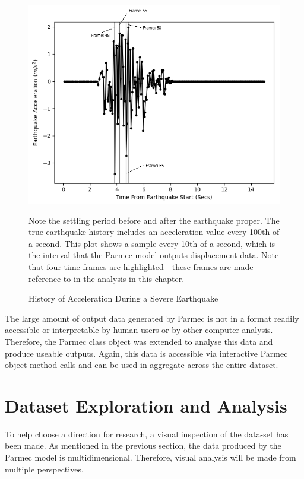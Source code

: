 \begin{figure}[ht]
	\centering
	\includegraphics[scale=0.85]{Figures/earthquake_time_points}
	\caption{History of Acceleration During a Severe Earthquake} {Note the settling period before and after the earthquake proper. The true earthquake history includes an acceleration value every 100th of a second. This plot shows a sample every 10th of a second, which is the interval that the Parmec model outputs displacement data. Note that four time frames are highlighted - these frames are made reference to in the analysis in this chapter.}
	\label{fig:earthquake}
\end{figure}

\noindent
The large amount of output data generated by Parmec is not in a format readily accessible or interpretable by human users or by other computer analysis. Therefore, the Parmec class object was extended to analyse this data and produce useable outputs. Again, this data is accessible via interactive Parmec object method calls and can be used in aggregate across the entire dataset.


\section{Dataset Exploration and Analysis} \label{data:visualisation}

To help choose a direction for research, a visual inspection of the data-set has been made. As mentioned in the previous section, the data produced by the Parmec model is multidimensional. Therefore, visual analysis will be made from multiple perspectives.

